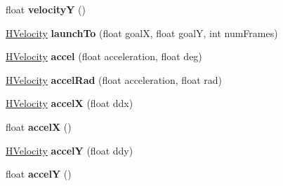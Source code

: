 \begin{DoxyCompactItemize}
\item 
\hypertarget{classhype_1_1behavior_1_1_h_velocity_abe7dc26576adae8adb48ce955702fff0}{float {\bfseries velocity\-Y} ()}\label{classhype_1_1behavior_1_1_h_velocity_abe7dc26576adae8adb48ce955702fff0}

\item 
\hypertarget{classhype_1_1behavior_1_1_h_velocity_ade008f6666ba982dfa247e6eb16e39c8}{\hyperlink{classhype_1_1behavior_1_1_h_velocity}{H\-Velocity} {\bfseries launch\-To} (float goal\-X, float goal\-Y, int num\-Frames)}\label{classhype_1_1behavior_1_1_h_velocity_ade008f6666ba982dfa247e6eb16e39c8}

\item 
\hypertarget{classhype_1_1behavior_1_1_h_velocity_a688277ffa9fc211da32da7f1671f0b43}{\hyperlink{classhype_1_1behavior_1_1_h_velocity}{H\-Velocity} {\bfseries accel} (float acceleration, float deg)}\label{classhype_1_1behavior_1_1_h_velocity_a688277ffa9fc211da32da7f1671f0b43}

\item 
\hypertarget{classhype_1_1behavior_1_1_h_velocity_a7c3bf557241fa32dc95a88682a1557e9}{\hyperlink{classhype_1_1behavior_1_1_h_velocity}{H\-Velocity} {\bfseries accel\-Rad} (float acceleration, float rad)}\label{classhype_1_1behavior_1_1_h_velocity_a7c3bf557241fa32dc95a88682a1557e9}

\item 
\hypertarget{classhype_1_1behavior_1_1_h_velocity_a76fdbb8a084fd536c8d2f4245a9e9578}{\hyperlink{classhype_1_1behavior_1_1_h_velocity}{H\-Velocity} {\bfseries accel\-X} (float ddx)}\label{classhype_1_1behavior_1_1_h_velocity_a76fdbb8a084fd536c8d2f4245a9e9578}

\item 
\hypertarget{classhype_1_1behavior_1_1_h_velocity_ab44947a8dd5df4a12ee2cd3295beea59}{float {\bfseries accel\-X} ()}\label{classhype_1_1behavior_1_1_h_velocity_ab44947a8dd5df4a12ee2cd3295beea59}

\item 
\hypertarget{classhype_1_1behavior_1_1_h_velocity_ad1dc3d8cf2f5ce87c2a5c5dd5048e399}{\hyperlink{classhype_1_1behavior_1_1_h_velocity}{H\-Velocity} {\bfseries accel\-Y} (float ddy)}\label{classhype_1_1behavior_1_1_h_velocity_ad1dc3d8cf2f5ce87c2a5c5dd5048e399}

\item 
\hypertarget{classhype_1_1behavior_1_1_h_velocity_a71da143ee1531bb9a57a9d155eaa7028}{float {\bfseries accel\-Y} ()}\label{classhype_1_1behavior_1_1_h_velocity_a71da143ee1531bb9a57a9d155eaa7028}


\end{DoxyCompactItemize}

